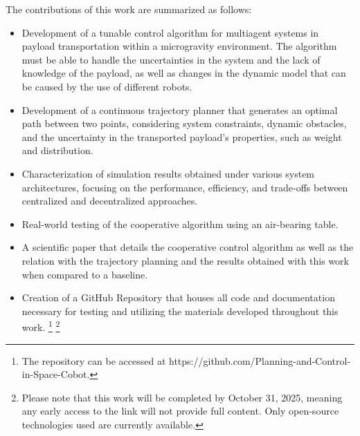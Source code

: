 The contributions of this work are summarized as follows:

\begin{itemize}
    \item Development of a tunable control algorithm for multiagent systems in payload transportation within a microgravity environment. The algorithm must be able to handle the uncertainties in the system and the lack of knowledge of the payload, as well as changes in the dynamic model that can be caused by the use of different robots.  
    \item Development of a continuous trajectory planner that generates an optimal path between two points, considering system constraints, dynamic obstacles, and the uncertainty in the transported payload's properties, such as weight and distribution. 
    \item Characterization of simulation results obtained under various system architectures, focusing on the performance, efficiency, and trade-offs between centralized and decentralized approaches.
    \item Real-world testing of the cooperative algorithm using an air-bearing table.
    \item A scientific paper that details the cooperative control algorithm as well as the relation with the trajectory planning and the results obtained with this work when compared to a baseline.
    \item Creation of a GitHub Repository that houses all code and documentation necessary for testing and utilizing the materials developed throughout this work. \footnote{The repository can be accessed at https://github.com/Planning-and-Control-in-Space-Cobot.} \footnote{Please note that this work will be completed by October 31, 2025, meaning any early access to the link will not provide full content. Only open-source technologies used are currently available.}
\end{itemize}